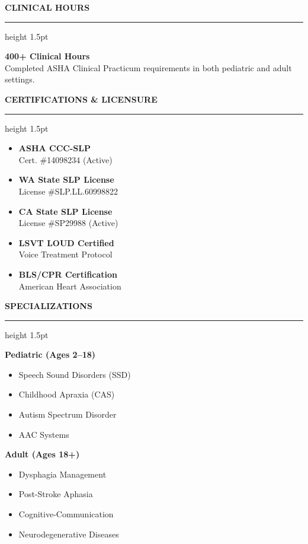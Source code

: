 \documentclass[10pt]{article}
\newcommand{\cvsection}[1]{%
  \vspace{10pt}%
  {\color{primary}\large\bfseries\MakeUppercase{#1}}%
  \vspace{3pt}%
  {\color{primary}\hrule height 1.5pt}%
  \vspace{6pt}%
}
\begin{document}
\begin{minipage}[t]{0.34\textwidth}
  \cvsection{Clinical Hours}
  \begin{tcolorbox}[
    colback=lightbg,
    colframe=primary,
    arc=3pt,
    outer arc=3pt,
    boxrule=1pt,
    top=6pt, bottom=6pt, left=8pt, right=8pt,
    boxsep=1pt
  ]
    \centering
    {\bfseries\color{primary}\large 400+ Clinical Hours} \\
    \vspace{2pt}
    {\color{darktext}\footnotesize Completed ASHA Clinical Practicum requirements in both pediatric and adult settings.}
  \end{tcolorbox}

  \cvsection{Certifications \& Licensure}
  \begin{itemize}[parsep=3pt]
    \item \textbf{ASHA CCC-SLP} \\ {\color{secondary}\footnotesize Cert. \#14098234 (Active)}
    \item \textbf{WA State SLP License} \\ {\color{secondary}\footnotesize License \#SLP.LL.60998822}
    \item \textbf{CA State SLP License} \\ {\color{secondary}\footnotesize License \#SP29988 (Active)}
    \item \textbf{LSVT LOUD Certified} \\ {\color{secondary}\footnotesize Voice Treatment Protocol}
    \item \textbf{BLS/CPR Certification} \\ {\color{secondary}\footnotesize American Heart Association}
  \end{itemize}
  
  \cvsection{Specializations}
  \textbf{Pediatric (Ages 2--18)}
  \begin{itemize}[parsep=1pt]
    \item Speech Sound Disorders (SSD)
    \item Childhood Apraxia (CAS)
    \item Autism Spectrum Disorder
    \item AAC Systems
  \end{itemize}
  
  \vspace{4pt}
  \textbf{Adult (Ages 18+)}
  \begin{itemize}[parsep=1pt]
    \item Dysphagia Management
    \item Post-Stroke Aphasia
    \item Cognitive-Communication
    \item Neurodegenerative Diseases
  \end{itemize}
  

\end{minipage}
\end{document}
